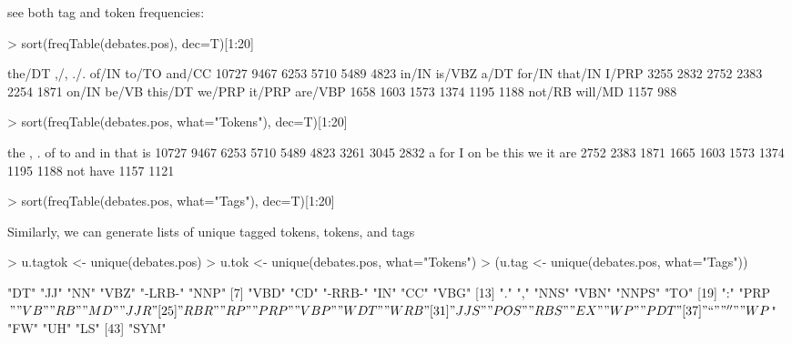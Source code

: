 \documentclass[11pt]{article}
\begin{document}
see both tag and token frequencies:
\begin{Schunk}
\begin{Sinput}
> sort(freqTable(debates.pos), dec=T)[1:20]
\end{Sinput}
\begin{Soutput}
 the/DT     ,/,     ./.   of/IN   to/TO  and/CC 
  10727    9467    6253    5710    5489    4823 
  in/IN  is/VBZ    a/DT  for/IN that/IN   I/PRP 
   3255    2832    2752    2383    2254    1871 
  on/IN   be/VB this/DT  we/PRP  it/PRP are/VBP 
   1658    1603    1573    1374    1195    1188 
 not/RB will/MD 
   1157     988 
\end{Soutput}
\begin{Sinput}
> sort(freqTable(debates.pos, what="Tokens"), dec=T)[1:20]
\end{Sinput}
\begin{Soutput}
  the     ,     .    of    to   and    in  that    is 
10727  9467  6253  5710  5489  4823  3261  3045  2832 
    a   for     I    on    be  this    we    it   are 
 2752  2383  1871  1665  1603  1573  1374  1195  1188 
  not  have 
 1157  1121 
\end{Soutput}
\begin{Sinput}
> sort(freqTable(debates.pos, what="Tags"), dec=T)[1:20]
\end{Sinput}
\end{Schunk}
Similarly, we can generate lists of unique tagged tokens, tokens, and
tags
\begin{Schunk}
\begin{Sinput}
> u.tagtok <- unique(debates.pos)
> u.tok <- unique(debates.pos, what="Tokens")
> (u.tag <- unique(debates.pos, what="Tags"))
\end{Sinput}
\begin{Soutput}
 [1] "DT"    "JJ"    "NN"    "VBZ"   "-LRB-" "NNP"  
 [7] "VBD"   "CD"    "-RRB-" "IN"    "CC"    "VBG"  
[13] "."     ","     "NNS"   "VBN"   "NNPS"  "TO"   
[19] ":"     "PRP$"  "VB"    "RB"    "MD"    "JJR"  
[25] "RBR"   "RP"    "PRP"   "VBP"   "WDT"   "WRB"  
[31] "JJS"   "POS"   "RBS"   "EX"    "WP"    "PDT"  
[37] "``"    "''"    "WP$"   "FW"    "UH"    "LS"   
[43] "SYM"  
\end{Soutput}
\end{Schunk}
\end{document}
